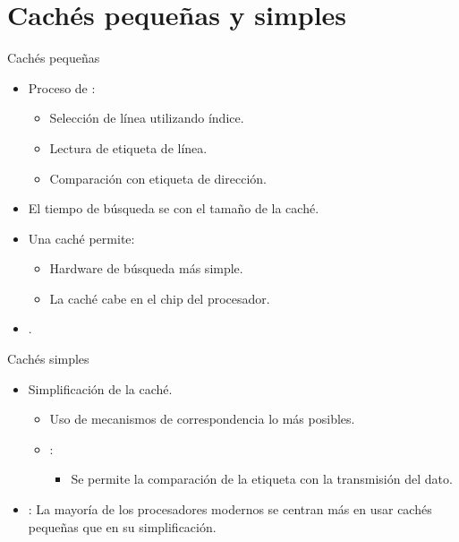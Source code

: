 \section{Cachés pequeñas y simples}

\begin{frame}[t]{Cachés pequeñas}
\begin{itemize}
  \item Proceso de :
    \begin{itemize}
      \item Selección de línea utilizando índice.
      \item Lectura de etiqueta de línea.
      \item Comparación con etiqueta de dirección.
    \end{itemize}

  \item El tiempo de búsqueda se  con 
        el tamaño de la caché.
  
  \item Una caché  permite:
    \begin{itemize}
      \item Hardware de búsqueda más simple.
      \item La caché cabe en el chip del procesador.
    \end{itemize}

  \item {}.
\end{itemize}
\end{frame}

\begin{frame}[t]{Cachés simples}
\begin{itemize}
  \item Simplificación de la caché.
    \begin{itemize}
      \item Uso de mecanismos de correspondencia lo más  posibles.
      \item {}:
        \begin{itemize}
          \item Se permite  la comparación de 
                la etiqueta con la transmisión del dato.
        \end{itemize}
    \end{itemize}

  \item {}:
        La mayoría de los procesadores modernos se centran más 
        en usar cachés pequeñas que en su simplificación.
\end{itemize}
\end{frame}

